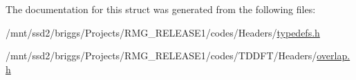 The documentation for this struct was generated from the following files\-:\begin{DoxyCompactItemize}
\item 
/mnt/ssd2/briggs/\-Projects/\-R\-M\-G\-\_\-\-R\-E\-L\-E\-A\-S\-E1/codes/\-Headers/\hyperlink{_headers_2typedefs_8h}{typedefs.\-h}\item 
/mnt/ssd2/briggs/\-Projects/\-R\-M\-G\-\_\-\-R\-E\-L\-E\-A\-S\-E1/codes/\-T\-D\-D\-F\-T/\-Headers/\hyperlink{overlap_8h}{overlap.\-h}\end{DoxyCompactItemize}
